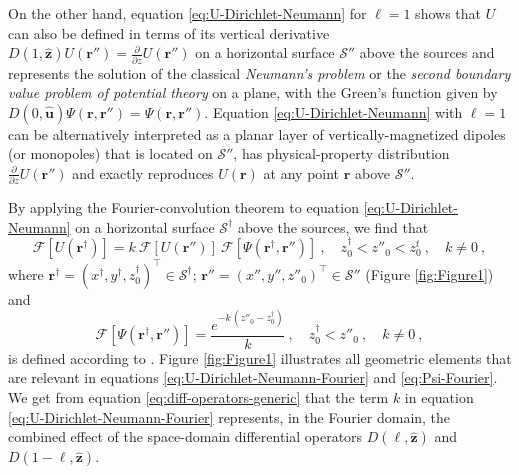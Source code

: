 On the other hand, equation \ref{eq:U-Dirichlet-Neumann} for $\ell = 1$ shows that $U$ can also
be defined in terms of its vertical derivative 
$D(1, \hat{\mathbf{z}}) U(\mathbf{r}'') = \tfrac{\partial}{\partial z} U(\mathbf{r}'')$ 
on a horizontal surface $\mathcal{S}''$ above the sources and represents the solution of the classical \textit{Neumann’s problem} or the 
\textit{second boundary value problem of potential theory} \cite[][ p. 246]{kellogg1967} on a plane, 
with the Green's function given by $D(0, \hat{\mathbf{u}}) \Psi(\mathbf{r}, \mathbf{r}'') = \Psi(\mathbf{r}, \mathbf{r}'')$.
Equation \ref{eq:U-Dirichlet-Neumann} with $\ell = 1$ can be alternatively interpreted as a planar layer of
vertically-magnetized dipoles (or monopoles) that is located on $\mathcal{S}''$, has 
physical-property distribution $\tfrac{\partial}{\partial z} U(\mathbf{r}'')$ and exactly reproduces 
$U(\mathbf{r})$ at any point $\mathbf{r}$ above $\mathcal{S}''$.

By applying the Fourier-convolution theorem \cite[][ p. 268]{blakely1996} to equation \ref{eq:U-Dirichlet-Neumann} 
on a horizontal surface $\mathcal{S}^{\dagger}$ above the sources, we find that
\begin{equation}
	\mathcal{F} [ U(\mathbf{r}^{\dagger}) ] = 
	k \: \mathcal{F} [ U(\mathbf{r}'') ] \:
	\mathcal{F} [ \Psi(\mathbf{r}^{\dagger}, \mathbf{r}'') ] \: ,
	\quad z^{\dagger}_{0} < z''_{0} < z^{t}_{0} \: , \quad k \ne 0 \: ,
	\label{eq:U-Dirichlet-Neumann-Fourier}
\end{equation}
where $\mathbf{r}^{\dagger} = (x^{\dagger}, y^{\dagger}, z^{\dagger}_{0})^{\top} \in \mathcal{S}^{\dagger}$; 
$\mathbf{r}'' = (x'', y'', z''_{0})^{\top} \in \mathcal{S}''$ (Figure \ref{fig:Figure1}) and
\begin{equation}
	\mathcal{F} [ \Psi(\mathbf{r}^{\dagger}, \mathbf{r}'') ] 
	= \frac{e^{- k \, (z''_{0} - z^{\dagger}_{0})}}{k}
	\: , \quad z^{\dagger}_{0} < z''_{0} \: , \quad k \ne 0 \: ,
	\label{eq:Psi-Fourier}
\end{equation}
is defined according to \citet[][ p. 275]{blakely1996}.
Figure \ref{fig:Figure1} illustrates all geometric elements that are relevant in equations  
\ref{eq:U-Dirichlet-Neumann-Fourier} and \ref{eq:Psi-Fourier}.
We get from equation \ref{eq:diff-operators-generic} that the term $k$ in equation \ref{eq:U-Dirichlet-Neumann-Fourier} represents,
in the Fourier domain, the combined effect of the space-domain differential operators $D(\ell, \hat{\mathbf{z}})$ and 
$D(1-\ell, \hat{\mathbf{z}})$.

